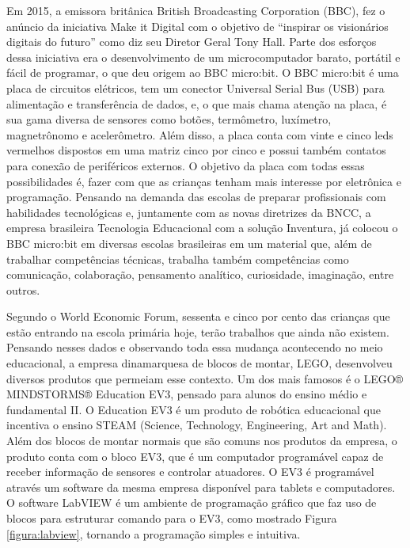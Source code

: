 Em 2015, a emissora britânica British Broadcasting Corporation (BBC), fez o anúncio da iniciativa Make it Digital com o objetivo de “inspirar os visionários digitais do futuro” como diz seu Diretor Geral Tony Hall. Parte dos esforços dessa iniciativa era o desenvolvimento de um microcomputador barato, portátil e fácil de programar, o que deu origem ao BBC micro:bit. O BBC micro:bit é uma placa de circuitos elétricos, tem um conector Universal Serial Bus (USB) para alimentação e transferência de dados, e, o que mais chama atenção na placa, é sua gama diversa de sensores como botões, termômetro, luxímetro, magnetrônomo e acelerômetro. Além disso, a placa conta com vinte e cinco leds vermelhos dispostos em uma matriz cinco por cinco e possui também contatos para conexão de periféricos externos. O objetivo da placa com todas essas possibilidades é, fazer com que as crianças tenham mais interesse por eletrônica e programação. Pensando na demanda das escolas de preparar profissionais com habilidades tecnológicas e, juntamente com as novas diretrizes da BNCC, a empresa brasileira Tecnologia Educacional com a solução Inventura, já colocou o BBC micro:bit em diversas escolas brasileiras em um material que, além de trabalhar competências técnicas, trabalha também competências como comunicação, colaboração, pensamento analítico, curiosidade, imaginação, entre outros. 

Segundo o World Economic Forum, sessenta e cinco por cento das crianças que estão entrando na escola primária hoje, terão trabalhos que ainda não existem. Pensando  nesses dados e observando toda essa mudança acontecendo no meio educacional, a empresa dinamarquesa de blocos de montar, LEGO, desenvolveu diversos produtos que permeiam esse contexto. Um dos mais famosos é o LEGO® MINDSTORMS® Education EV3, pensado para alunos do ensino médio e fundamental II. O Education EV3 é um produto de robótica educacional que incentiva o ensino STEAM (Science, Technology, Engineering, Art and Math). Além dos blocos de montar normais que são comuns nos produtos da empresa, o produto conta com o bloco EV3, que é um computador programável capaz de receber informação de sensores e controlar atuadores. O EV3 é programável através um software da mesma empresa disponível para tablets e computadores. O software LabVIEW é um ambiente de programação gráfico que faz uso de blocos para estruturar comando para o EV3, como mostrado Figura \ref{figura:labview}, tornando a programação simples e intuitiva. 


